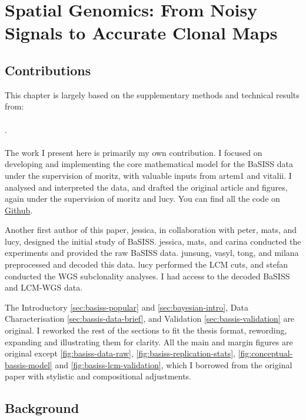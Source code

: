 \chapter{Spatial Genomics: From Noisy Signals to Accurate Clonal Maps}
\label{sec:chapter-basiss-model}

\section*{Contributions}
This chapter is largely based on the supplementary methods and technical results from:
\\~\\
 . 
\\~\\
The work I present here is primarily my own contribution. I focused on developing and implementing the core mathematical model for the \acs{BaSISS} data under the supervision of \ac{moritz}, with valuable inputs from \ac{artem1} and \ac{vitalii}. I analysed and interpreted the data, and drafted the original article and figures, again under the supervision of \ac{moritz} and \ac{lucy}. You can find all the code on \href{https://github.com/gerstung-lab/BaSISS}{Github}.

Another first author of this paper, \acs{jessica}, in collaboration with \acs{peter}, \acs{mats}, and \acs{lucy}, designed the initial study of \acs{BaSISS}. \acs{jessica}, \acs{mats}, and \acs{carina} conducted the experiments and provided the raw \acs{BaSISS} data. \acs{junsung}, \acs{vasyl}, \acs{tong}, and \acs{milana} preprocessed and decoded this data. \acs{lucy} performed the \acs{LCM} cuts, and \acs{stefan} conducted the \acs{WGS} subclonality analyses. I had access to the decoded \acs{BaSISS} and \acs{LCM}-\acs{WGS} data.

The Introductory \cref{sec:basiss-popular} and \cref{sec:bayesian-intro}, Data Characterisation \cref{sec:bassis-data-brief}, and Validation \cref{sec:bassis-validation} are original. I reworked the rest of the sections to fit the thesis format, rewording, expanding and illustrating them for clarity. All the main and margin figures are original except \cref{fig:basiss-data-raw}, \cref{fig:basiss-replication-stats}, \cref{fig:conceptual-bassis-model} and \cref{fig:basiss-lcm-validation}, which I borrowed from the original paper with stylistic and compositional adjustments. 

\section{Background}
